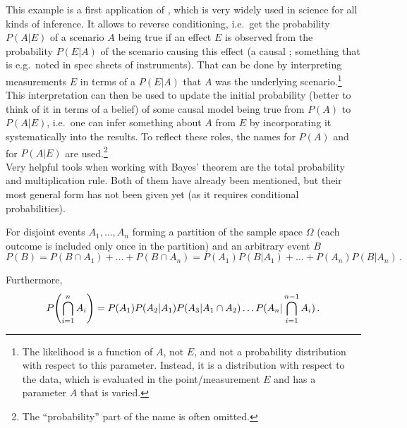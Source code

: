 This example is a first application of , which is very widely used in science for all kinds of inference. It allows to reverse conditioning, i.e.~get the probability $P(A | E)$ of a scenario $A$ being true if an effect $E$ is observed from the probability $P(E | A)$ of the scenario causing this effect (a causal ; something that is e.g.~noted in spec sheets of instruments). That can be done by interpreting measurements $E$ in terms of a  $P(E | A)$ that $A$ was the underlying scenario.\footnote{The likelihood is a function of $A$, not $E$, and not a probability distribution with respect to this parameter. Instead, it is a distribution with respect to the data, which is evaluated in the point/measurement $E$ and has a parameter $A$ that is varied.} This interpretation can then be used to update the initial probability (better to think of it in terms of a belief) of some causal model being true from $P(A)$ to $P(A| E)$, i.e.~one can infer something about $A$ from $E$ by incorporating it systematically into the results. To reflect these roles, the names  for $P(A)$ and  for $P(A | E)$ are used.\footnote{The \enquote{probability} part of the name is often omitted.}\\


Very helpful tools when working with Bayes' theorem are the total probability and multiplication rule. Both of them have already been mentioned, but their most general form has not been given yet (as it requires conditional probabilities).
\begin{prop}
For disjoint events $A_1, \dots, A_n$ forming a partition of the sample space $\Omega$ (each outcome is included only once in the partition) and an arbitrary event $B$
\begin{equation}\label{eq:tot_prob_rule}
P(B) = P(B \cap A_1) + \dots + P(B \cap A_n) = P(A_1) P(B | A_1) + \dots + P(A_n) P(B | A_n) \, .
\end{equation}

Furthermore,
\begin{equation}
P\qty(\bigcap_{i = 1}^n A_i) = P(A_1) P(A_2 | A_1) P(A_3 | A_1 \cap A_2) \dots P(A_n | \bigcap_{i = 1}^{n - 1} A_i) \, .
\end{equation}
\end{prop}


